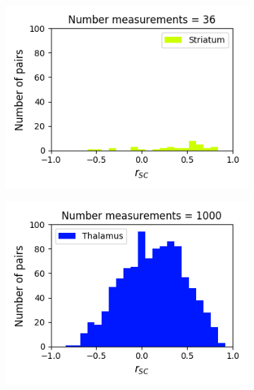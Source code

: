 \documentclass[a4paper,12pt]{article}
\theoremstyle{definition}
\begin{document}
\begin{figure}[p]
\begin{subfigure}{0.5\textwidth}
  \end{subfigure}
  \begin{subfigure}{0.5\textwidth}
    \centering
    \includegraphics[width=\textwidth]{figures/strong_striatum_14_1p0_correlation_histogram.png}
  \end{subfigure}
  \begin{subfigure}{0.5\textwidth}
    \centering
    \includegraphics[width=\textwidth]{figures/strong_thalamus_8_1p0_correlation_histogram.png}
  \end{subfigure}
  \begin{subfigure}{0.5\textwidth}
    \centering

\end{subfigure}
\end{figure}
\end{document}
